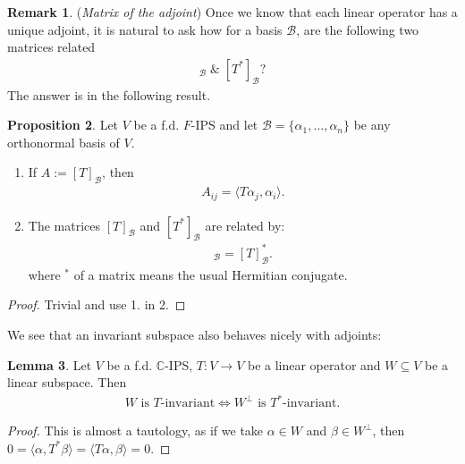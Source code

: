 \documentclass[letterpaper,11pt,twoside]{article}
\theoremstyle{definition}
\newtheorem{proposition}{Proposition}[subsection]
\theoremstyle{definition}
\theoremstyle{definition}
\newtheorem{remark}[proposition]{\textbf{Remark}}
\theoremstyle{definition}
\newtheorem{lemma}[proposition]{\textbf{Lemma}}
\theoremstyle{definition}
\theoremstyle{definition}
\theoremstyle{remark}
\theoremstyle{definition}
\newcommand{\ip}[2]{\langle #1,#2 \rangle}
\newcommand{\C}{\mathbb{C}}
\begin{document}
	\begin{remark}
		(\textit{Matrix of the adjoint}) Once we know that each linear operator has a unique adjoint, it is natural to ask how for a basis $ \mathcal{B} $, are the following two matrices related
		\begin{align*}
			[T]_{\mathcal{B}} \;\&\; [T^{*}]_{\mathcal{B}}?
		\end{align*}
		The answer is in the following result.
	\end{remark}
    
    \begin{proposition}\label{P-4.2.3}
    	Let $ V $ be a f.d. $ F $-IPS and let $ \mathcal{B} = \{\alpha_1,\dots,\alpha_n\} $ be any orthonormal basis of $ V $.
    	\begin{enumerate}
    		\item {If $ A:=[T]_{\mathcal{B}} $, then 
    		\begin{align*}
    			A_{ij} = \ip{T\alpha_j}{\alpha_i}.
    		\end{align*}	
    	}
    		\item {The matrices $ [T]_{\mathcal{B}} $ and $ [T^{*}]_{\mathcal{B}} $ are related by:
    		\begin{align*}
    			[T^{*}]_{\mathcal{B}} = [T]_{\mathcal{B}}^{*}.
    		\end{align*}	
    		where $ ^{*} $ of a matrix means the usual Hermitian conjugate.
    	}
    	\end{enumerate}
    \end{proposition}
    \begin{proof}
    	Trivial and use 1. in 2.
    \end{proof}
	We see that an invariant subspace also behaves nicely with adjoints:
	\begin{lemma}\label{L-4.2.4}
		Let $ V $ be a f.d. $ \C $-IPS, $ T :V\to V $ be a linear operator and $ W\subseteq V $ be a linear subspace. Then
		\begin{align*}
			W\text{ is }T\text{-invariant} \iff 	W^{\perp}\text{ is }T^{*}\text{-invariant}. 
		\end{align*}
	\end{lemma}
	\begin{proof}
		This is almost a tautology, as if we take $ \alpha \in W $ and $ \beta \in W^{\perp} $, then $0 = \ip{\alpha}{T^{*}\beta} = \ip{T\alpha}{\beta} = 0 $.
	\end{proof}
\end{document}
